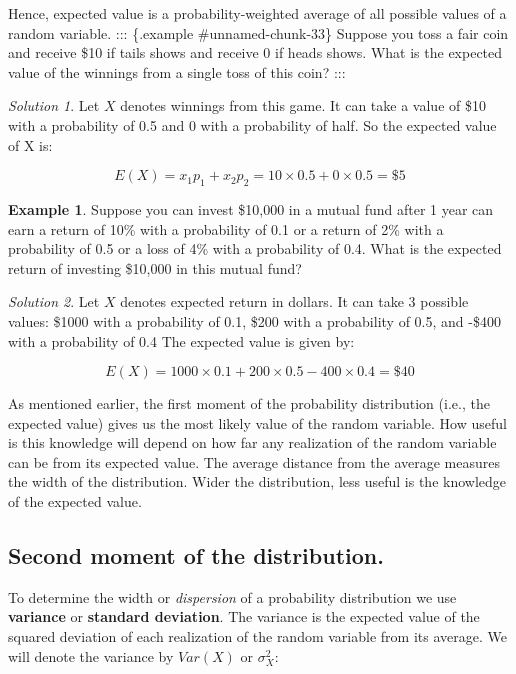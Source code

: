 \documentclass[
]{book}
\theoremstyle{definition}
\theoremstyle{definition}
\newtheorem{example}{Example}[chapter]
\theoremstyle{definition}
\theoremstyle{definition}
\theoremstyle{remark}
\newtheorem*{solution}{Solution}
\begin{document}
Hence, expected value is a probability-weighted average of all possible values of a random variable.
::: \{.example \#unnamed-chunk-33\}
Suppose you toss a fair coin and receive \$10 if tails shows and receive 0 if heads shows. What is the expected value of the winnings from a single toss of this coin?
:::

\begin{solution}
Let \(X\) denotes winnings from this game. It can take a value of \$10 with a probability of 0.5 and 0 with a probability of half. So the expected value of X is:

\[E(X) = x_1 p_1+x_2 p_2=10\times 0.5 + 0\times 0.5=\$5\]
\end{solution}

\begin{example}
\protect\hypertarget{exm:unnamed-chunk-35}{}\label{exm:unnamed-chunk-35}Suppose you can invest \$10,000 in a mutual fund after 1 year can earn a return of 10\%
with a probability of 0.1 or a return of 2\% with a probability of 0.5 or a loss of 4\% with a probability of 0.4. What is the expected return of investing \$10,000 in this mutual fund?
\end{example}

\begin{solution}
Let \(X\) denotes expected return in dollars. It can take 3 possible values: \$1000 with a probability of 0.1, \$200 with a probability of 0.5, and -\$400 with a probability of 0.4 The expected value is given by:

\[E(X) = 1000\times 0.1 + 200 \times 0.5 - 400 \times 0.4=\$40 \]
\end{solution}

As mentioned earlier, the first moment of the probability distribution (i.e., the expected value) gives us the most likely value of the random variable. How useful is this knowledge will depend on how far any realization of the random variable can be from its expected value. The average distance from the average measures the width of the distribution. Wider the distribution, less useful is the knowledge of the expected value.

\hypertarget{second-moment-of-the-distribution.}{%
\subsection{Second moment of the distribution.}\label{second-moment-of-the-distribution.}}

To determine the width or \emph{dispersion} of a probability distribution we use \textbf{variance} or \textbf{standard deviation}. The variance is the expected value of the squared deviation of each realization of the random variable from its average. We will denote the variance by \(Var(X)\) or \(\sigma^2_X\):
\end{document}
